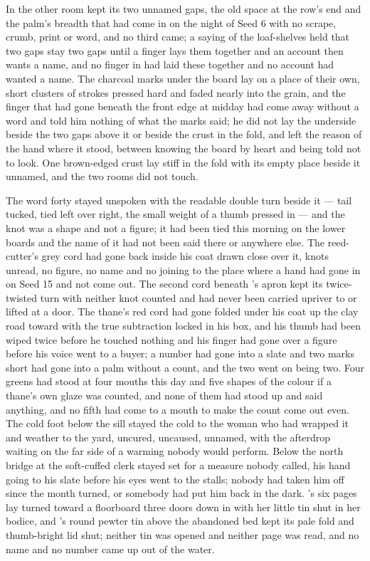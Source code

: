 \scenebreak

In the other room  kept its two unnamed gaps, the old space at the row's end and the palm's breadth that had come in on the night of Seed 6 with no scrape, crumb, print or word, and no third came; a saying of the loaf-shelves held that two gaps stay two gaps until a finger lays them together and an account then wants a name, and no finger in  had laid these together and no account had wanted a name. The charcoal marks under the board lay on a place of their own, short clusters of strokes pressed hard and faded nearly into the grain, and the finger that had gone beneath the front edge at midday had come away without a word and told him nothing of what the marks said; he did not lay the underside beside the two gaps above it or beside the crust in the fold, and left the reason of the hand where it stood, between knowing the board by heart and being told not to look. One brown-edged crust lay stiff in the fold with its empty place beside it unnamed, and the two rooms did not touch.

The word forty stayed unspoken with the readable double turn beside it --- tail tucked, tied left over right, the small weight of a thumb pressed in --- and the knot was a shape and not a figure; it had been tied this morning on the lower boards and the name of it had not been said there or anywhere else. The reed-cutter's grey cord had gone back inside his coat drawn close over it, knots unread, no figure, no name and no joining to the place where a hand had gone in on Seed 15 and not come out. The second cord beneath 's apron kept its twice-twisted turn with neither knot counted and had never been carried upriver to  or lifted at a door. The thane's red cord had gone folded under his coat up the clay road toward  with the true subtraction locked in his box, and his thumb had been wiped twice before he touched nothing and his finger had gone over a figure before his voice went to a buyer; a number had gone into a slate and two marks short had gone into a palm without a count, and the two went on being two. Four greens had stood at four mouths this day and five shapes of the colour if a thane's own glaze was counted, and none of them had stood up and said anything, and no fifth had come to a mouth to make the count come out even. The cold foot below the sill stayed the cold to the woman who had wrapped it and weather to the yard, uncured, uncaused, unnamed, with the afterdrop waiting on the far side of a warming nobody would perform. Below the north bridge at  the soft-cuffed clerk stayed set for a measure nobody called, his hand going to his slate before his eyes went to the stalls; nobody had taken him off since the month turned, or somebody had put him back in the dark. 's six pages lay turned toward a floorboard three doors down in  with her little tin shut in her bodice, and 's round pewter tin above the abandoned bed kept its pale fold and thumb-bright lid shut; neither tin was opened and neither page was read, and no name and no number came up out of the water.

